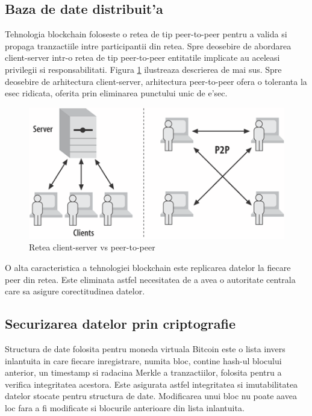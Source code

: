 \documentclass[12pt,a4paper,twoside]{report}
\begin{document}
\subsection{Baza de date distribuit'a}
Tehnologia blockchain foloseste o retea de tip peer-to-peer pentru a valida si propaga tranzactiile intre participantii din retea. Spre deosebire de abordarea client-server intr-o retea de tip peer-to-peer entitatile implicate au aceleasi privilegii si responsabilitati\cite{p2p}. Figura \ref{fig:p2p} ilustreaza descrierea de mai sus. Spre deosebire de arhitectura client-server, arhitectura peer-to-peer ofera o toleranta la esec ridicata, oferita prin eliminarea punctului unic de e'sec.\\

		\begin{figure}[H]
		\begin{center}
			\includegraphics[scale=2]{img/p2p.png}
			\caption{Retea client-server vs peer-to-peer\cite{fabricdoc}}
  			\label{fig:p2p}
  		\end{center}
  		\end{figure}

O alta caracteristica a tehnologiei blockchain este replicarea datelor la fiecare peer din retea. Este eliminata astfel necesitatea de a avea o autoritate centrala care sa asigure corectitudinea datelor.   		

\subsection{Securizarea datelor prin criptografie}
Structura de date folosita pentru moneda virtuala Bitcoin este o lista invers inlantuita in care fiecare inregistrare, numita bloc, contine hash-ul blocului anterior, un timestamp si radacina Merkle a tranzactiilor, folosita pentru a verifica integritatea acestora\cite{bitcoin}. 
Este asigurata astfel integritatea si imutabilitatea datelor stocate pentru structura de date. Modificarea unui bloc nu poate aavea loc fara a fi modificate si blocurile anterioare din lista inlantuita.
\end{document}
